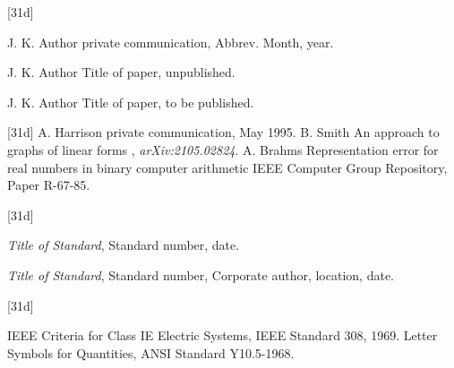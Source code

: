 \documentclass[letter]{IEEEtaes}
\begin{document}
\vspace*{-12pt}
\begin{thebibliography}{[31d]}
\item[] J. K. Author
\newblock private communication, Abbrev. Month, year.
\item[] J. K. Author
\newblock Title of paper, unpublished.
\item[] J. K. Author
\newblock Title of paper, to be published.
\end{thebibliography}

\vspace*{-12pt}

\begin{thebibliography}{[31d]}
\setcounter{enumiv}{20}
A. Harrison
\newblock private communication, May 1995.
B. Smith
\newblock An approach to graphs of linear forms
, \emph{arXiv:2105.02824}.
A. Brahms
\newblock Representation error for real numbers in binary computer arithmetic
\newblock IEEE Computer Group Repository, Paper R-67-85.
\end{thebibliography}


\vspace*{-12pt}
\begin{thebibliography}{[31d]}
\item[a)]\emph{Title of Standard}, Standard number, date.
\item[b)]\emph{Title of Standard}, Standard number, Corporate author, location, date.
\end{thebibliography}


\vspace*{-12pt}
\begin{thebibliography}{[31d]}
\setcounter{enumiv}{23}

IEEE Criteria for Class IE Electric Systems, IEEE Standard 308, 1969.
Letter Symbols for Quantities, ANSI Standard Y10.5-1968.
\end{thebibliography}
\end{document}
